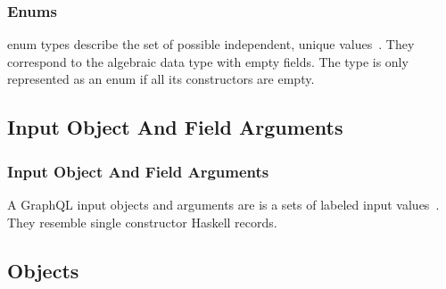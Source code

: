 \begin{frame}\frametitle{Enums}

enum types describe the set of possible independent, unique values~\cite{gql-spec}. They correspond to the algebraic data type with empty fields. The type is only represented as an enum if all its constructors are empty.


\end{frame}

\subsection{Input Object And Field Arguments}
\begin{frame}\frametitle{Input Object And Field Arguments}

A GraphQL input objects and arguments are is a sets of labeled input values~\cite{gql-spec}. They resemble single constructor Haskell records. 


\subsection{Objects}

\end{frame}

